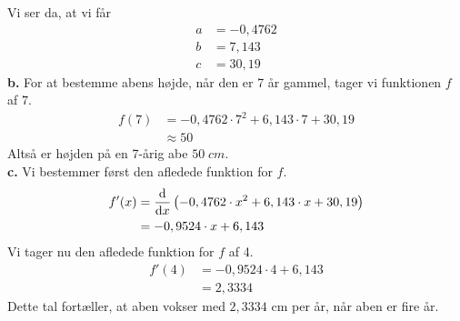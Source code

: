 \documentclass{article}
\begin{document}
Vi ser da, at vi får 
\begin{equation*}
\begin{split}
  a&=-0,4762 \\
  b&=7,143 \\ 
  c&= 30,19
\end{split}
\end{equation*}
\textbf{b.}
For at bestemme abens højde, når den er 7 år gammel, tager vi funktionen $f$ af $7$. 
\begin{equation*}
\begin{split}
  f(7)&=-0,4762 \cdot 7^2 + 6,143 \cdot 7 + 30,19\\ 
  &\approx 50
\end{split}
\end{equation*}
Altså er højden på en 7-årig abe $50 \;\unit{cm} $.\\[1ex]
\textbf{c.}
Vi bestemmer først den afledede funktion for $f$.
\begin{equation*}
\begin{split}
  f'(x)&=\dv{x} \left(-0,4762 \cdot x^2 + 6,143 \cdot x + 30,19\right) \\ 
  &=-0,9524 \cdot x + 6,143
\end{split}
\end{equation*}
Vi tager nu den afledede funktion for $f$ af 4. 
\begin{equation*}
\begin{split}
  f'(4)&=-0,9524 \cdot 4+6,143\\
  &=2,3334
\end{split}
\end{equation*}
Dette tal fortæller, at aben vokser med $2,3334$ cm per år, når aben er fire år. 
\end{document}
